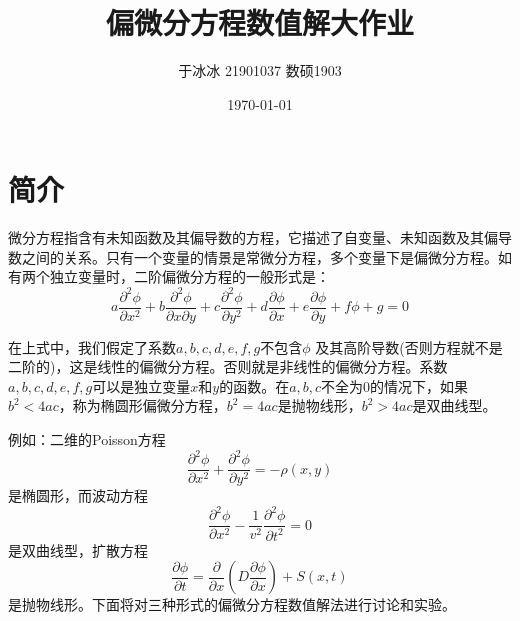 \documentclass[fontset=mac]{ctexart}
\title{偏微分方程数值解大作业}
\author{于冰冰 21901037 数硕1903}
\date{\today}
\begin{document}
	\maketitle
	\tableofcontents
	\newpage
	\section{简介}
	微分方程指含有未知函数及其偏导数的方程，它描述了自变量、未知函数及其偏导数之间的关系。只有一个变量的情景是常微分方程，多个变量下是偏微分方程。如有两个独立变量时，二阶偏微分方程的一般形式是：
	$$
	a \frac{\partial ^2 \phi}{\partial x^2} + b \frac{\partial ^ 2 \phi}{\partial x \partial y} + c \frac{\partial ^ 2 \phi}{\partial y^2} + d \frac{\partial \phi}{\partial x} + e \frac{\partial \phi}{\partial y} + f \phi + g =0
	$$
	
	在上式中，我们假定了系数$a,b,c,d,e,f,g$不包含$\phi$ 及其高阶导数(否则方程就不是二阶的)，这是线性的偏微分方程。否则就是非线性的偏微分方程。系数$a,b,c,d,e,f,g$可以是独立变量$x$和$y$的函数。在$a,b,c$不全为$0$的情况下，如果$b^2<4ac$，称为椭圆形偏微分方程，$b^2=4ac$是抛物线形，$b^2>4ac$是双曲线型。
	
	例如：二维的Poisson方程$$
	\frac{\partial^{2} \phi}{\partial x^{2}}+\frac{\partial^{2} \phi}{\partial y^{2}}=-\rho(x, y)
	$$
	是椭圆形，而波动方程
	$$
	\frac{\partial^{2} \phi}{\partial x^{2}}-\frac{1}{v^{2}} \frac{\partial^{2} \phi}{\partial t^{2}}=0
	$$
	是双曲线型，扩散方程
	$$
	\frac{\partial \phi}{\partial t}=\frac{\partial}{\partial x}\left(D \frac{\partial \phi}{\partial x}\right)+S(x, t)
	$$
	是抛物线形。下面将对三种形式的偏微分方程数值解法进行讨论和实验。
	
	\newpage
\end{document}
